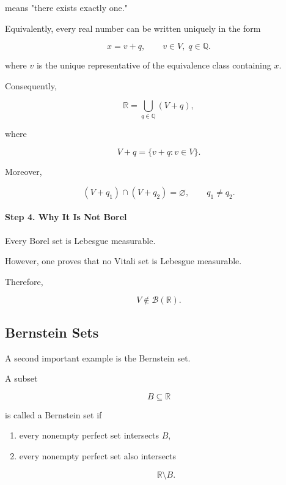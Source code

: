 \documentclass[11pt]{article}
\begin{document}
	means "there exists exactly one."
	
	Equivalently, every real number can be written uniquely in the form
	
	\[
	\boxed{
		x=v+q,
		\qquad
		v\in V,\;
		q\in\mathbb Q.
	}
	\]
	
	where \(v\) is the unique representative of the equivalence class containing
	\(x\).
	
	Consequently,
	
	\[
	\mathbb R
	=
	\bigcup_{q\in\mathbb Q}
	(V+q),
	\]
	
	where
	
	\[
	V+q
	=
	\{v+q:v\in V\}.
	\]
	
	Moreover,
	
	\[
	(V+q_1)\cap(V+q_2)=\varnothing,
	\qquad
	q_1\neq q_2.
	\]
	
	
	\paragraph{Step 4. Why It Is Not Borel}
	
	Every Borel set is Lebesgue measurable.
	
	However, one proves that no Vitali set is Lebesgue measurable.
	
	Therefore,
	
	\[
	\boxed{
		V
		\notin
		\mathcal B(\mathbb R).
	}
	\]
	
	
	\subsection{Bernstein Sets}
	
	A second important example is the Bernstein set.
	
	A subset
	
	\[
	B\subseteq\mathbb R
	\]
	
	is called a Bernstein set if
	
	\begin{enumerate}
		\item
		every nonempty perfect set intersects \(B\),
		
		\item
		every nonempty perfect set also intersects
		
		\[
		\mathbb R\setminus B.
		\]
	\end{enumerate}
	
\end{document}
